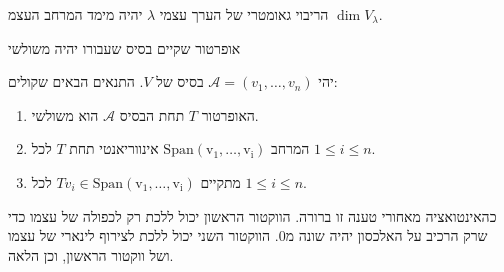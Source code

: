 \documentclass{tstextbook}
\begin{document}
\begin{proposition}
הריבוי גאומטרי של הערך עצמי \(\lambda\) יהיה מימד המרחב העצמ \(\dim V_{\lambda}\).

\end{proposition}
\begin{definition}
אופרטור שקיים בסיס שעבורו יהיה משולשי

\end{definition}
\begin{proposition}
יהי \(\mathcal{A}=\left( v_{1},\dots,v_{n} \right)\) בסיס של \(V\). התנאים הבאים שקולים:

\end{proposition}
\begin{enumerate}
  \item האופרטור \(T\) תחת הבסיס \(\mathcal{ A}\) הוא משולשי. 


  \item המרחב \(\mathrm{Span\left( v_{1},\dots,v_{i} \right)}\) אינווריאנטי תחת \(T\) לכל \(1\leq i\leq n\).  


  \item מתקיים \(Tv_{i}\in \mathrm{Span\left( v_{1},\dots,v_{i} \right)}\) לכל \(1\leq i\leq n\). 


\end{enumerate}
כהאינטואציה מאחורי טענה זו ברורה. הווקטור הראשון יכול ללכת רק לכפולה של עצמו כדי שרק הרכיב על האלכסון יהיה שונה מ0. הווקטור השני יכול ללכת לצירוף לינארי של עצמו ושל ווקטור הראשון, וכן הלאה.
\end{document}
